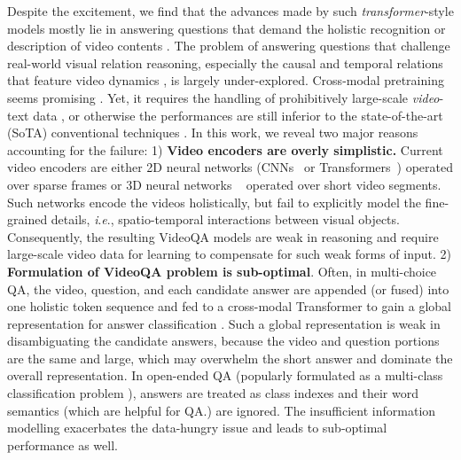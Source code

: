 \documentclass[runningheads]{llncs}
\newcommand{\ie}{\textit{i}.\textit{e}.}
\newcommand{\trans}{\emph{transformer}}
\begin{document}
Despite the excitement, we find that the advances made by such \trans-style models mostly lie in answering questions that demand the holistic recognition or description of video contents \cite{lei2018tvqa,seo2021look,xu2017video,xu2021videoclip,yang2021just,yu2018joint,zhu2020actbert}. The problem of answering questions that challenge real-world visual relation reasoning, especially the causal and temporal relations that feature video dynamics \cite{jang2017tgif,xiao2021next}, is largely under-explored. Cross-modal pretraining seems promising \cite{lei2021less,yu2021learning,zellers2021merlot}. Yet, it requires the handling of prohibitively large-scale \emph{video}-text data \cite{fu2021violet,zellers2021merlot}, or otherwise the performances are still inferior to the state-of-the-art (SoTA) conventional techniques \cite{lei2021less,seo2021attend,yu2021learning}. In this work, we reveal two major reasons accounting for the failure: 
1) \textbf{Video encoders are overly simplistic.} Current video encoders are either 2D neural networks (CNNs~\cite{he2016deep,ren2015faster} or Transformers~\cite{dosovitskiy2020image}) operated over sparse frames or 3D neural networks ~\cite{bertasius2021space,liu2021video,xie2018rethinking} operated over short video segments. Such networks encode the videos holistically, but fail to explicitly model the fine-grained details, \ie, spatio-temporal interactions between visual objects. Consequently, the resulting VideoQA models are weak in reasoning and require large-scale video data for learning to compensate for such weak forms of input.
2) \textbf{Formulation of VideoQA problem is sub-optimal}. Often, in multi-choice QA, the video, question, and each candidate answer are appended (or fused) into one holistic token sequence and fed to a cross-modal Transformer to gain a global representation for answer classification \cite{zhu2020actbert,lei2021less}. Such a global representation is weak in disambiguating the candidate answers, because the video and question portions are the same and large, which may overwhelm the short answer and dominate the overall representation. In open-ended QA (popularly formulated as a multi-class classification problem \cite{xu2017video}), answers are treated as class indexes and their word semantics (which are helpful for QA.) are ignored. The insufficient information modelling exacerbates the data-hungry issue and leads to sub-optimal performance as well.
\vspace{-0.1cm}
\end{document}
